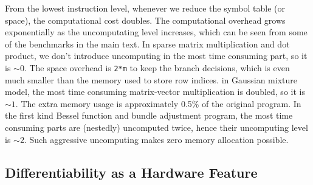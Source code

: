 \documentclass{article}
\newcommand{\<}{\langle}
\renewcommand{\>}{\rangle}
\theoremstyle{definition}\newtheorem{definition}{\textit{Definition}}
\begin{document}
From the lowest instruction level, whenever we reduce the symbol table (or space), the computational cost doubles.
The computational overhead grows exponentially as the uncomputating level increases, which can be seen from some of the benchmarks in the main text.
In sparse matrix multiplication and dot product, we don't introduce uncomputing in the most time consuming part, so it is $\sim0$. The space overhead is \texttt{2*m} to keep the branch decisions, which is even much smaller than the memory used to store row indices.
in Gaussian mixture model, the most time consuming matrix-vector multiplication is doubled, so it is $\sim 1$. The extra memory usage is approximately 0.5\% of the original program.
In the first kind Bessel function and bundle adjustment program, the most time consuming parts are (nestedly) uncomputed twice, hence their uncomputing level is $\sim2$.
Such aggressive uncomputing makes zero memory allocation possible.

\subsection{Differentiability as a Hardware Feature}\label{sec:hardware}
\end{document}
